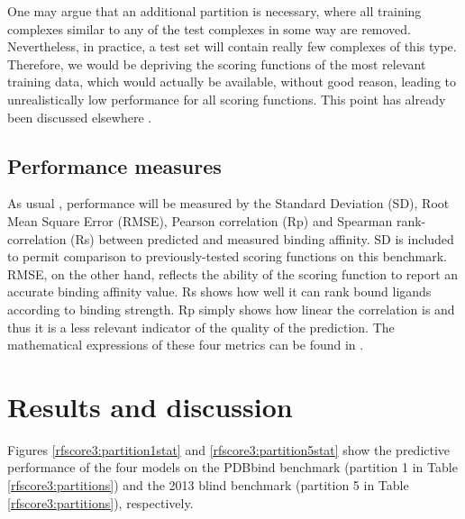 One may argue that an additional partition is necessary, where all training complexes similar to any of the test complexes in some way are removed. Nevertheless, in practice, a test set will contain really few complexes of this type. Therefore, we would be depriving the scoring functions of the most relevant training data, which would actually be available, without good reason, leading to unrealistically low performance for all scoring functions. This point has already been discussed elsewhere \citep{908,1432}.

\subsection{Performance measures}

As usual \citep{1313}, performance will be measured by the Standard Deviation (SD), Root Mean Square Error (RMSE), Pearson correlation (Rp) and Spearman rank-correlation (Rs) between predicted and measured binding affinity. SD is included to permit comparison to previously-tested scoring functions on this benchmark. RMSE, on the other hand, reflects the ability of the scoring function to report an accurate binding affinity value. Rs shows how well it can rank bound ligands according to binding strength. Rp simply shows how linear the correlation is and thus it is a less relevant indicator of the quality of the prediction. The mathematical expressions of these four metrics can be found in \citep{1432}.

\section{Results and discussion}

Figures \ref{rfscore3:partition1stat} and \ref{rfscore3:partition5stat} show the predictive performance of the four models on the PDBbind benchmark (partition 1 in Table \ref{rfscore3:partitions}) and the 2013 blind benchmark (partition 5 in Table \ref{rfscore3:partitions}), respectively.

